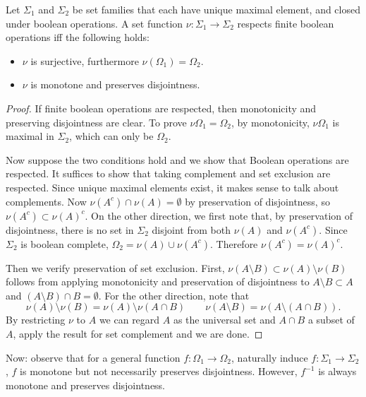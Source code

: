 
\begin{lemma}
	Let $\Sigma_1$ and $\Sigma_2$ be set families that each have unique maximal element, and closed under boolean operations.
	A set function $\nu: \Sigma_1 \to  \Sigma_2$ respects finite boolean operations iff the following holds:
	\begin{itemize}
		\item $\nu$ is surjective, furthermore $\nu(\Omega_1) = \Omega_2$.
		\item $\nu$ is monotone and preserves disjointness.
	\end{itemize}
\end{lemma}
\begin{proof}
	If finite boolean operations are respected, then monotonicity and preserving disjointness are clear. To prove $\nu \Omega_1 = \Omega_2$, by monotonicity, $\nu \Omega_1$ is maximal in $\Sigma_2$, which can only be $\Omega_2$.

	Now suppose the two conditions hold and we show that Boolean operations are respected. It suffices to show that taking complement and set exclusion are respected. Since unique maximal elements exist, it makes sense to talk about complements. Now $\nu(A^c) \cap \nu(A) = \emptyset $ by preservation of disjointness, so $\nu(A^c) \subset \nu(A)^c$. On the other direction, we first note that, by preservation of disjointness, there is no set in $\Sigma_2$ disjoint from both $\nu (A)$ and $\nu(A^c)$. Since $\Sigma_2$ is boolean complete, $\Omega_2 = \nu(A) \cup  \nu(A^c)$. Therefore $\nu(A^c) = \nu(A)^c$.

	Then we verify preservation of set exclusion. First, $\nu(A \setminus  B) \subset \nu(A) \setminus \nu(B)$ follows from applying monotonicity and preservation of disjointness to $A \setminus B \subset A$ and $(A \setminus B ) \cap B = \emptyset $. For the other direction, note that
	\[
		\nu(A) \setminus \nu(B) = \nu(A) \setminus \nu(A \cap B) \qquad 
		\nu(A \setminus B) = \nu\left( A \setminus \left( A \cap  B \right)  \right) 
	.\] 
	By restricting $\nu$ to $A$ we can regard $A$ as the universal set and $A \cap B$ a subset of $A$, apply the result for set complement and we are done.
\end{proof}

Now: observe that 
for a general function $f: \Omega_1 \to \Omega_2$, naturally induce $f: \Sigma_1 \to  \Sigma_2$, $f$ is monotone but not necessarily preserves disjointness. However, $f^{-1}$ is always monotone and preserves disjointness.


